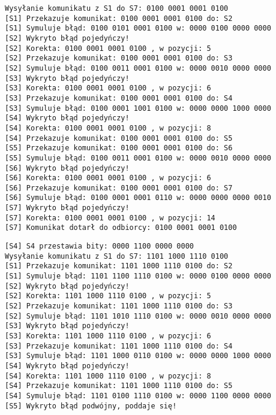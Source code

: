 \begin{empty}
	\begin{verbatim}
Wysyłanie komunikatu z S1 do S7: 0100 0001 0001 0100
[S1] Przekazuje komunikat: 0100 0001 0001 0100 do: S2
[S1] Symuluje błąd: 0100 0101 0001 0100 w: 0000 0100 0000 0000
[S2] Wykryto błąd pojedyńczy!
[S2] Korekta: 0100 0001 0001 0100 , w pozycji: 5
[S2] Przekazuje komunikat: 0100 0001 0001 0100 do: S3
[S2] Symuluje błąd: 0100 0011 0001 0100 w: 0000 0010 0000 0000
[S3] Wykryto błąd pojedyńczy!
[S3] Korekta: 0100 0001 0001 0100 , w pozycji: 6
[S3] Przekazuje komunikat: 0100 0001 0001 0100 do: S4
[S3] Symuluje błąd: 0100 0001 1001 0100 w: 0000 0000 1000 0000
[S4] Wykryto błąd pojedyńczy!
[S4] Korekta: 0100 0001 0001 0100 , w pozycji: 8
[S4] Przekazuje komunikat: 0100 0001 0001 0100 do: S5
[S5] Przekazuje komunikat: 0100 0001 0001 0100 do: S6
[S5] Symuluje błąd: 0100 0011 0001 0100 w: 0000 0010 0000 0000
[S6] Wykryto błąd pojedyńczy!
[S6] Korekta: 0100 0001 0001 0100 , w pozycji: 6
[S6] Przekazuje komunikat: 0100 0001 0001 0100 do: S7
[S6] Symuluje błąd: 0100 0001 0001 0110 w: 0000 0000 0000 0010
[S7] Wykryto błąd pojedyńczy!
[S7] Korekta: 0100 0001 0001 0100 , w pozycji: 14
[S7] Komunikat dotarł do odbiorcy: 0100 0001 0001 0100
	\end{verbatim}
	\vspace{-10pt}
\end{empty}

\newpage
\begin{empty}
	\begin{verbatim}
[S4] S4 przestawia bity: 0000 1100 0000 0000
Wysyłanie komunikatu z S1 do S7: 1101 1000 1110 0100
[S1] Przekazuje komunikat: 1101 1000 1110 0100 do: S2
[S1] Symuluje błąd: 1101 1100 1110 0100 w: 0000 0100 0000 0000
[S2] Wykryto błąd pojedyńczy!
[S2] Korekta: 1101 1000 1110 0100 , w pozycji: 5
[S2] Przekazuje komunikat: 1101 1000 1110 0100 do: S3
[S2] Symuluje błąd: 1101 1010 1110 0100 w: 0000 0010 0000 0000
[S3] Wykryto błąd pojedyńczy!
[S3] Korekta: 1101 1000 1110 0100 , w pozycji: 6
[S3] Przekazuje komunikat: 1101 1000 1110 0100 do: S4
[S3] Symuluje błąd: 1101 1000 0110 0100 w: 0000 0000 1000 0000
[S4] Wykryto błąd pojedyńczy!
[S4] Korekta: 1101 1000 1110 0100 , w pozycji: 8
[S4] Przekazuje komunikat: 1101 1000 1110 0100 do: S5
[S4] Symuluje błąd: 1101 0100 1110 0100 w: 0000 1100 0000 0000
[S5] Wykryto błąd podwójny, poddaje się!
	\end{verbatim}
	\vspace{-10pt}
\end{empty}
